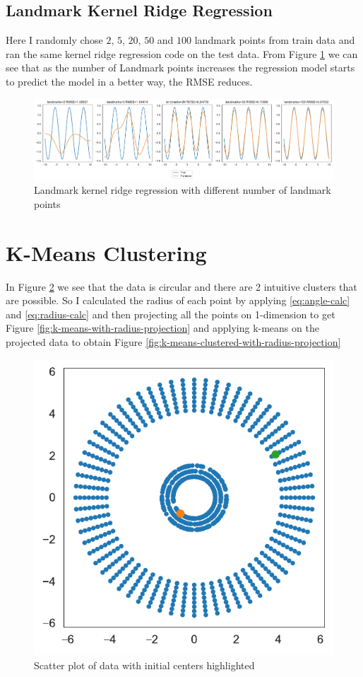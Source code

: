 \documentclass[a4paper,11pt]{article}
\begin{document}
\begin{mlsolution}
        \subsection{Landmark Kernel Ridge Regression}
        Here I randomly chose $2$, $5$, $20$, $50$ and $100$ landmark points from train data and ran the same kernel ridge regression code on the test data. From Figure \ref{fig:landmark-kernel-rdge-regression} we can see that as the number of Landmark points increases the regression model starts to predict the model in a better way, the RMSE reduces.
        \begin{figure}[h]
            \includegraphics[width=\textwidth]{images/landmark-kernel-ridge-regression.pdf}
            \caption{Landmark kernel ridge regression with different number of landmark points}
            \label{fig:landmark-kernel-rdge-regression}
        \end{figure}

    \section{K-Means Clustering}

        In Figure \ref{fig:k-means-initial-plot} we see that the data is circular and there are 2 intuitive clusters that are possible. So I calculated the radius of each point by applying \ref{eq:angle-calc} and \ref{eq:radius-calc} and then projecting all the points on 1-dimension to get Figure \ref{fig:k-means-with-radius-projection} and applying k-means on the projected data to obtain Figure \ref{fig:k-means-clustered-with-radius-projection}
        \begin{figure}[h]
            \centering
            \includegraphics[width=.3\textwidth]{images/k-means-initial-plot.pdf}
            \caption{Scatter plot of data with initial centers highlighted}
            \label{fig:k-means-initial-plot}
        \end{figure}


\end{mlsolution}
\end{document}
